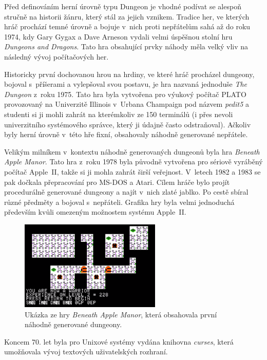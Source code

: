 Před definováním herní úrovně typu Dungeon je vhodné podívat se alespoň stručně na historii žánru, který stál za jejich vznikem.
Tradice her, ve kterých hráč prochází temné úrovně a bojuje v~nich proti nepřátelům sahá až do roku 1974, kdy Gary Gygax a Dave Arneson vydali velmi úspěšnou stolní hru \textit{Dungeons and Dragons}.
Tato hra obsahující prvky náhody měla velký vliv na následný vývoj počítačových her.
\par
Historicky první dochovanou hrou na hrdiny, ve které hráč procházel dungeony, bojoval s~příšerami a vylepšoval svou postavu, je hra nazvaná jednoduše \textit{The Dungeon} z~roku 1975.
Tato hra byla vytvořena pro výukový počítač PLATO provozovaný na Univerzitě Illinois v~Urbana Champaign pod názvem \textit{pedit5} a studenti si ji mohli zahrát na kterémkoliv ze 150 terminálů (i přes nevoli univerzitního systémového správce, který ji údajně často odstraňoval).
Ačkoliv byly herní úrovně v~této hře fixní, obsahovaly náhodně generované nepřátele.
\par
Velikým milníkem v~kontextu náhodně generovaných dungeonů byla hra \textit{Beneath Apple Manor}.
Tato hra z~roku 1978 byla původně vytvořena pro sériově vyráběný počítač Apple~II, takže si ji mohla zahrát širší veřejnost.
V~letech 1982 a 1983 se pak dočkala přepracování pro MS-DOS a Atari.
Cílem hráče bylo projít procedurálně generované dungeony a najít v~nich zlaté jablko.
Po cestě sbíral různé předměty a bojoval s~nepřáteli.
Grafika hry byla velmi jednoduchá především kvůli omezeným možnostem systému Apple~II.
\begin{figure}[hbt]
    \centering
    \includegraphics[width=0.6\textwidth]{obrazky/beneath_apple_manor.png}
    \caption{Ukázka ze hry \textit{Beneath Apple Manor}, která obsahovala první náhodně generované dungeony.}
    \label{img:beneath_apple_manor}
\end{figure}
\par
Koncem 70. let byla pro Unixové systémy vydána knihovna \textit{curses}, která umožňovala vývoj textových uživatelských rozhraní.
